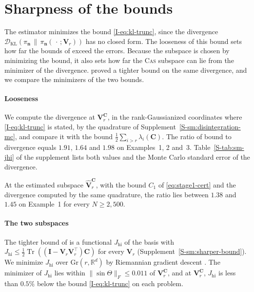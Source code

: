 \documentclass[review,hidelinks,onefignum,onetabnum]{siamart251216}
\newcommand{\RR}{\mathbb{R}}
\newcommand{\DKL}{\mathcal{D}_{\mathrm{KL}}}
\newcommand{\tr}{\operatorname{Tr}}
\newcommand{\mC}{\bm{C}}
\newcommand{\mV}{\bm{V}}
\newcommand{\hmV}{\widehat{\bm{V}}}
\newcommand{\mI}{\bm{I}}
\newcommand{\Gr}{\mathrm{Gr}}
\newcommand{\vn}{\bm{n}}
\begin{document}
\section{Sharpness of the bounds}
\label{sec:tightness}

The estimator minimizes the bound \eqref{I-eq:kl-trunc}, since the divergence $\DKL(\pi_{\vn}\,\|\,\pi_{\vn}(\,\cdot\,;\mV_r))$ has no closed form. The looseness of this bound sets how far the bounds of  exceed the errors. Because the subspace is chosen by minimizing the bound, it also sets how far the \textsc{Cas} subspace can lie from the minimizer of the divergence. \cite{LiCuiLiMarzoukZahm2024sharp} proved a tighter bound on the same divergence, and we compare the minimizers of the two bounds.

\paragraph{Looseness}
We compute the divergence at $\mV_r^{\mC}$, in the rank-Gaussianized coordinates where \eqref{I-eq:kl-trunc} is stated, by the quadrature of Supplement~\ref{S-sm:disintegration-mc}, and compare it with the bound $\tfrac12\sum_{i>r}\lambda_i(\mC)$. The ratio of bound to divergence equals $1.91$, $1.64$ and $1.98$ on Examples~1, 2 and~3. Table~\ref{S-tab:sm-jhi} of the supplement lists both values and the Monte Carlo standard error of the divergence.

At the estimated subspace $\hmV_r^{\mC}$, with the bound $C_1$ of \eqref{eq:stage1-cert} and the divergence computed by the same quadrature, the ratio lies between $1.38$ and $1.45$ on Example~1 for every $N \ge 2{,}500$.

\paragraph{The two subspaces}
The tighter bound of \cite{LiCuiLiMarzoukZahm2024sharp} is a functional $J_{\mathrm{hi}}$ of the basis with $J_{\mathrm{hi}} \le \tfrac12\tr((\mI-\mV_r\mV_r^\top)\mC)$ for every $\mV_r$ (Supplement~\ref{S-sm:sharper-bound}). We minimize $J_{\mathrm{hi}}$ over $\Gr(r,\RR^d)$ by Riemannian gradient descent \cite{AbsilMahonySepulchre2008}. The minimizer of $J_{\mathrm{hi}}$ lies within $\|\sin\Theta\|_F \le 0.011$ of $\mV_r^{\mC}$, and at $\mV_r^{\mC}$, $J_{\mathrm{hi}}$ is less than $0.5\%$ below the bound \eqref{I-eq:kl-trunc} on each problem.
\end{document}

